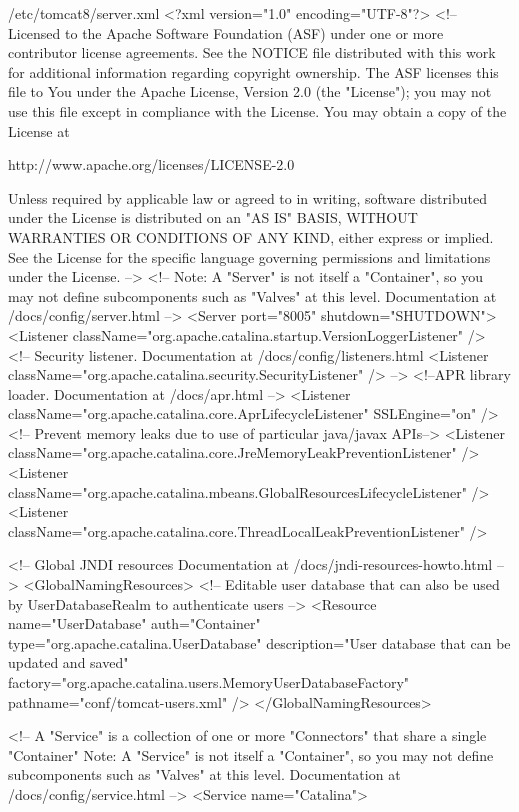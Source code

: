 \documentclass{tarentanleitung}
\begin{document}
\begin{lstdump}[basicstyle=\ttfamily\footnotesize]{/etc/tomcat8/server.xml}
<?xml version="1.0" encoding="UTF-8"?>
<!--
  Licensed to the Apache Software Foundation (ASF) under one or more
  contributor license agreements.  See the NOTICE file distributed with
  this work for additional information regarding copyright ownership.
  The ASF licenses this file to You under the Apache License, Version 2.0
  (the "License"); you may not use this file except in compliance with
  the License.  You may obtain a copy of the License at

      http://www.apache.org/licenses/LICENSE-2.0

  Unless required by applicable law or agreed to in writing, software
  distributed under the License is distributed on an "AS IS" BASIS,
  WITHOUT WARRANTIES OR CONDITIONS OF ANY KIND, either express or implied.
  See the License for the specific language governing permissions and
  limitations under the License.
-->
<!-- Note:  A "Server" is not itself a "Container", so you may not
     define subcomponents such as "Valves" at this level.
     Documentation at /docs/config/server.html
 -->
<Server port="8005" shutdown="SHUTDOWN">
  <Listener className="org.apache.catalina.startup.VersionLoggerListener" />
  <!-- Security listener. Documentation at /docs/config/listeners.html
  <Listener className="org.apache.catalina.security.SecurityListener" />
  -->
  <!--APR library loader. Documentation at /docs/apr.html -->
  <Listener className="org.apache.catalina.core.AprLifecycleListener" SSLEngine="on" />
  <!-- Prevent memory leaks due to use of particular java/javax APIs-->
  <Listener className="org.apache.catalina.core.JreMemoryLeakPreventionListener" />
  <Listener className="org.apache.catalina.mbeans.GlobalResourcesLifecycleListener" />
  <Listener className="org.apache.catalina.core.ThreadLocalLeakPreventionListener" />

  <!-- Global JNDI resources
       Documentation at /docs/jndi-resources-howto.html
  -->
  <GlobalNamingResources>
    <!-- Editable user database that can also be used by
         UserDatabaseRealm to authenticate users
    -->
    <Resource name="UserDatabase" auth="Container"
              type="org.apache.catalina.UserDatabase"
              description="User database that can be updated and saved"
              factory="org.apache.catalina.users.MemoryUserDatabaseFactory"
              pathname="conf/tomcat-users.xml" />
  </GlobalNamingResources>

  <!-- A "Service" is a collection of one or more "Connectors" that share
       a single "Container" Note:  A "Service" is not itself a "Container",
       so you may not define subcomponents such as "Valves" at this level.
       Documentation at /docs/config/service.html
   -->
  <Service name="Catalina">


\end{lstdump}
\end{document}
